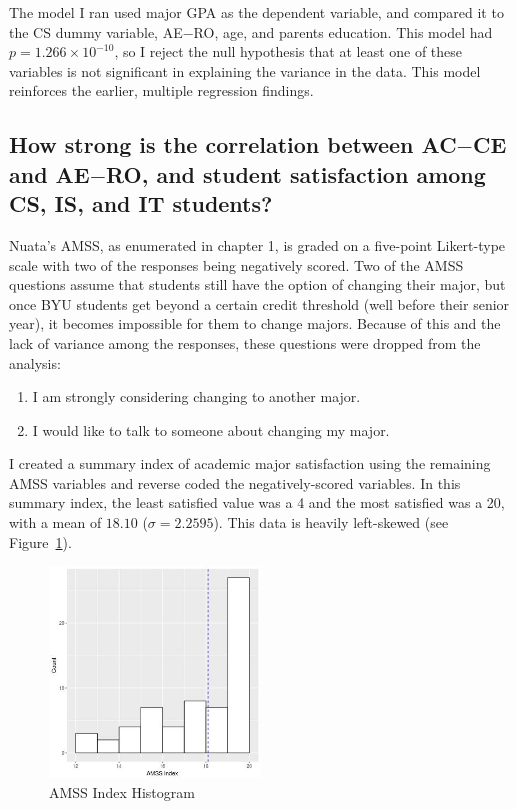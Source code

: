 The model I ran used major GPA as the dependent variable, and compared it to the CS dummy variable, AE$-$RO, age, and parents education. This model had $p=1.266\times 10^{-10}$, so I reject the null hypothesis that at least one of these variables is not significant in explaining the variance in the data. This model reinforces the earlier, multiple regression findings.

\subsection{How strong is the correlation between AC$-$CE and AE$-$RO, and student satisfaction among CS, IS, and IT students?}
Nuata's AMSS, as enumerated in chapter 1, is graded on a five-point Likert-type scale with two of the responses being negatively scored. Two of the AMSS questions assume that students still have the option of changing their major, but once BYU students get beyond a certain credit threshold (well before their senior year), it becomes impossible for them to change majors. Because of this and the lack of variance among the responses, these questions were dropped from the analysis:
\begin{enumerate}
  \item I am strongly considering changing to another major.
  \item I would like to talk to someone about changing my major.
\end{enumerate}

I created a summary index of academic major satisfaction using the remaining AMSS variables and reverse coded the negatively-scored variables. In this summary index, the least satisfied value was a 4 and the most satisfied was a 20, with a mean of $18.10$ ($\sigma=2.2595$). This data is heavily left-skewed (see Figure~\ref{fig:amss_index_plot}).

\begin{figure}[!hbtp]
  \centering
  \includegraphics[width=0.5\textwidth]{figures/chapter4/amss_index_plot.jpg}
  \caption{AMSS Index Histogram}
  \label{fig:amss_index_plot}
\end{figure}

